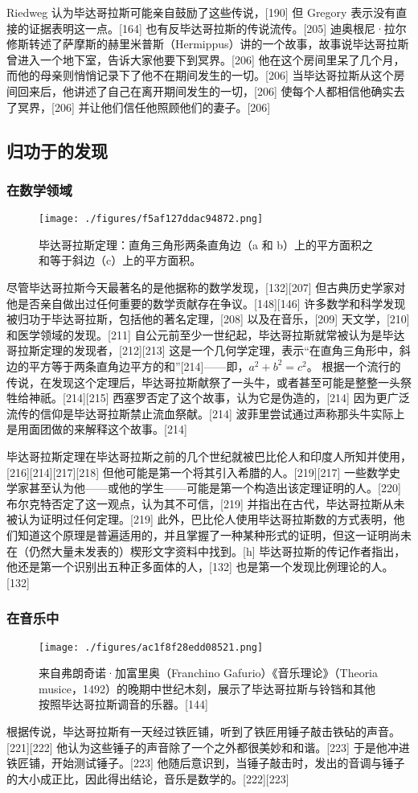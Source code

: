 Riedweg 认为毕达哥拉斯可能亲自鼓励了这些传说，[190] 但 Gregory 表示没有直接的证据表明这一点。[164] 也有反毕达哥拉斯的传说流传。[205] 迪奥根尼·拉尔修斯转述了萨摩斯的赫里米普斯（Hermippus）讲的一个故事，故事说毕达哥拉斯曾进入一个地下室，告诉大家他要下到冥界。[206] 他在这个房间里呆了几个月，而他的母亲则悄悄记录下了他不在期间发生的一切。[206] 当毕达哥拉斯从这个房间回来后，他讲述了自己在离开期间发生的一切，[206] 使每个人都相信他确实去了冥界，[206] 并让他们信任他照顾他们的妻子。[206]
\subsection{归功于的发现}  
\subsubsection{在数学领域}
\begin{figure}[ht]
\centering
\texttt{[image: ./figures/f5af127ddac94872.png]}
\caption{毕达哥拉斯定理：直角三角形两条直角边（a 和 b）上的平方面积之和等于斜边（c）上的平方面积。} \label{fig_Pythag_12}
\end{figure}
尽管毕达哥拉斯今天最著名的是他据称的数学发现，[132][207] 但古典历史学家对他是否亲自做出过任何重要的数学贡献存在争议。[148][146] 许多数学和科学发现被归功于毕达哥拉斯，包括他的著名定理，[208] 以及在音乐，[209] 天文学，[210] 和医学领域的发现。[211] 自公元前至少一世纪起，毕达哥拉斯就常被认为是毕达哥拉斯定理的发现者，[212][213] 这是一个几何学定理，表示“在直角三角形中，斜边的平方等于两条直角边平方的和”[214]——即，\(a^{2} + b^{2} = c^{2}\)。 根据一个流行的传说，在发现这个定理后，毕达哥拉斯献祭了一头牛，或者甚至可能是整整一头祭牲给神祇。[214][215] 西塞罗否定了这个故事，认为它是伪造的，[214] 因为更广泛流传的信仰是毕达哥拉斯禁止流血祭献。[214] 波菲里尝试通过声称那头牛实际上是用面团做的来解释这个故事。[214]

毕达哥拉斯定理在毕达哥拉斯之前的几个世纪就被巴比伦人和印度人所知并使用，[216][214][217][218] 但他可能是第一个将其引入希腊的人。[219][217] 一些数学史学家甚至认为他——或他的学生——可能是第一个构造出该定理证明的人。[220] 布尔克特否定了这一观点，认为其不可信，[219] 并指出在古代，毕达哥拉斯从未被认为证明过任何定理。[219] 此外，巴比伦人使用毕达哥拉斯数的方式表明，他们知道这个原理是普遍适用的，并且掌握了一种某种形式的证明，但这一证明尚未在（仍然大量未发表的）楔形文字资料中找到。[h] 毕达哥拉斯的传记作者指出，他还是第一个识别出五种正多面体的人，[132] 也是第一个发现比例理论的人。[132]
\subsubsection{在音乐中}
\begin{figure}[ht]
\centering
\texttt{[image: ./figures/ac1f8f28edd08521.png]}
\caption{来自弗朗奇诺·加富里奥（Franchino Gafurio）《音乐理论》（Theoria musice，1492）的晚期中世纪木刻，展示了毕达哥拉斯与铃铛和其他按照毕达哥拉斯调音的乐器。[144]} \label{fig_Pythag_13}
\end{figure}
根据传说，毕达哥拉斯有一天经过铁匠铺，听到了铁匠用锤子敲击铁砧的声音。[221][222] 他认为这些锤子的声音除了一个之外都很美妙和和谐。[223] 于是他冲进铁匠铺，开始测试锤子。[223] 他随后意识到，当锤子敲击时，发出的音调与锤子的大小成正比，因此得出结论，音乐是数学的。[222][223]
